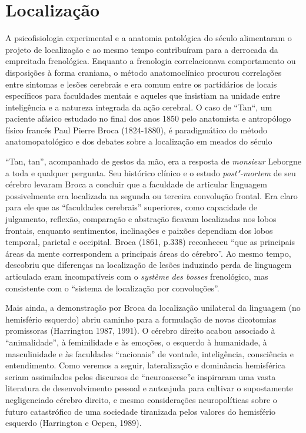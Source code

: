 \chapter{Localização}

A psicofisiologia experimental e a anatomia patológica do século 
alimentaram o projeto de localização e ao mesmo tempo contribuíram para
a derrocada da empreitada frenológica. Enquanto a frenologia
correlacionava comportamento ou disposições à forma craniana, o método
anatomoclínico procurou correlações entre sintomas e lesões cerebrais e
era comum entre os partidários de locais específicos para faculdades
mentais e aqueles que insistiam na unidade entre inteligência e a
natureza integrada da ação cerebral. O caso de ``Tan``, um paciente
afásico estudado no final dos anos 1850 pelo anatomista e antropólogo
físico francês Paul Pierre Broca (1824-1880), é paradigmático do método
anatomopatológico e dos debates sobre a localização em meados do século

``Tan, tan'', acompanhado de gestos da mão, era a resposta de
\emph{monsieur} Leborgne a toda e qualquer pergunta. Seu histórico
clínico e o estudo \emph{post"-mortem} de seu cérebro levaram Broca a
concluir que a faculdade de articular linguagem possivelmente era
localizada na segunda ou terceira convolução frontal. Era claro para ele
que as ``faculdades cerebrais'' superiores, como capacidade de
julgamento, reflexão, comparação e abstração ficavam localizadas nos
lobos frontais, enquanto sentimentos, inclinações e paixões dependiam
dos lobos temporal, parietal e occipital. Broca (1861, p.338) reconheceu
``que as principais áreas da mente correspondem a principais áreas do
cérebro''. Ao mesmo tempo, descobriu que diferenças na localização de
lesões induzindo perda de linguagem articulada eram incompatíveis com o
\emph{système des bosses} frenológico, mas consistente com o ``sistema
de localização por convoluções''.

Mais ainda, a demonstração por Broca da localização unilateral da
linguagem (no hemisfério esquerdo) abriu caminho para a formulação de
novas dicotomias promissoras (Harrington 1987, 1991). O cérebro direito
acabou associado à ``animalidade'', à feminilidade e às emoções, o
esquerdo à humanidade, à masculinidade e às faculdades ``racionais'' de
vontade, inteligência, consciência e entendimento. Como veremos a
seguir, lateralização e dominância hemisférica seriam assimilados pelos
discursos de ``neuroascese''e inspiraram uma vasta literatura de
desenvolvimento pessoal e autoajuda para cultivar o supostamente
negligenciado cérebro direito, e mesmo considerações neuropolíticas
sobre o futuro catastrófico de uma sociedade tiranizada pelos valores do
hemisfério esquerdo (Harrington e Oepen, 1989).

